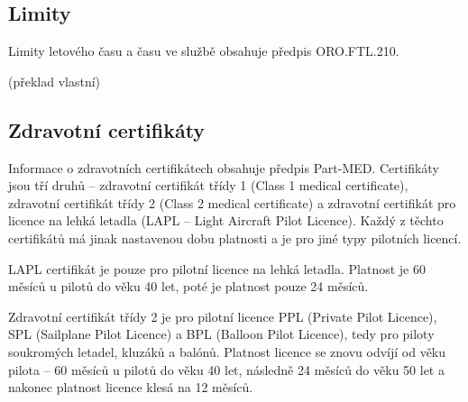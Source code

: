\documentclass[thesis=M,czech]{FITthesis}[2012/06/26]
\begin{document}
\subsection{Limity}
Limity letového času a času ve službě obsahuje předpis ORO.FTL.210.

 \cite{FTL} (překlad vlastní)

\subsection{Zdravotní certifikáty}
Informace o zdravotních certifikátech obsahuje předpis Part-MED. Certifikáty jsou tří druhů -- zdravotní certifikát třídy 1 (Class 1 medical certificate), zdravotní certifikát třídy 2 (Class 2 medical certificate) a zdravotní certifikát pro licence na lehká letadla (LAPL -- Light Aircraft Pilot Licence). Každý z těchto certifikátů má jinak nastavenou dobu platnosti a je pro jiné typy pilotních licencí.

LAPL certifikát je pouze pro pilotní licence na lehká letadla. Platnost je 60 měsíců u pilotů do věku 40 let, poté je platnost pouze 24 měsíců.

Zdravotní certifikát třídy 2 je pro pilotní licence PPL (Private Pilot Licence), SPL (Sailplane Pilot Licence) a BPL (Balloon Pilot Licence), tedy pro piloty soukromých letadel, kluzáků a balónů. Platnost licence se znovu odvíjí od věku pilota -- 60 měsíců u pilotů do věku 40 let, následně 24 měsíců do věku 50 let a nakonec platnost licence klesá na 12 měsíců.
\end{document}
